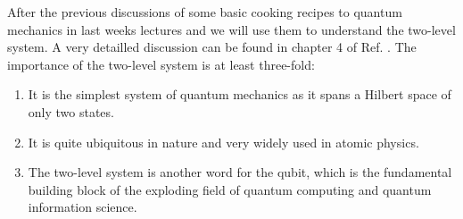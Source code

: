After the previous discussions of some basic cooking recipes to quantum mechanics in last weeks lectures \cite{Jendrzejewskia} and \cite{Jendrzejewski} we will use them to understand the two-level system. A very detailled discussion can be found in chapter 4 of Ref. \cite{1}. The importance of the two-level system is at least three-fold:
\begin{enumerate}
\item It is the simplest system of quantum mechanics as it spans a Hilbert space of only two states.
\item It is quite ubiquitous in nature and very widely used in atomic physics.
\item The two-level system is another word for the qubit, which is the fundamental building block of the exploding field of quantum computing and quantum information science.
\end{enumerate}

